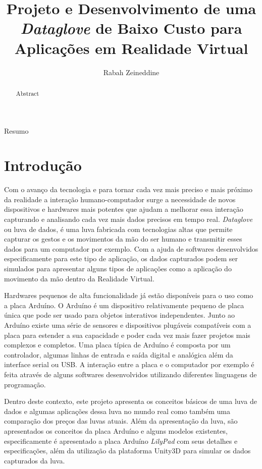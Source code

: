 \documentclass[12pt]{article}
\title{Projeto e Desenvolvimento de uma \textit{Dataglove} de Baixo Custo para Aplicações em Realidade Virtual}
\author{Rabah Zeineddine}
\begin{document}
 

\maketitle

\begin{abstract}
    Abstract
\end{abstract}
     
\begin{resumo} 
    Resumo
\end{resumo}


\section{Introdução}

Com o avanço da tecnologia e para tornar cada vez mais preciso e mais próximo da realidade a interação humano-computador surge a necessidade de novos dispositivos e hardwares mais potentes que ajudam a melhorar essa interação capturando e analisando cada vez mais dados precisos em tempo real. \textit{Dataglove} ou luva de dados, é uma luva fabricada com tecnologias altas que permite capturar os gestos e os movimentos da mão do ser humano e transmitir esses dados para um computador por exemplo. Com a ajuda de softwares desenvolvidos especificamente para este tipo de aplicação, os dados capturados podem ser simulados para apresentar alguns tipos de aplicações como a aplicação do movimento da mão dentro da Realidade Virtual.

Hardwares pequenos de alta funcionalidade já estão disponíveis para o uso como a placa Arduíno. O Arduíno é um dispositivo relativamente pequeno de placa única que pode ser usado para objetos interativos independentes. Junto ao Arduíno existe uma série de sensores e dispositivos plugáveis compatíveis com a placa para estender a sua capacidade e poder cada vez mais fazer projetos mais complexos e completos. Uma placa típica de Arduíno é composta por um controlador, algumas linhas de entrada e saída digital e analógica além da interface serial ou USB. A interação entre a placa e o computador por exemplo é feita através de alguns softwares desenvolvidos utilizando diferentes linguagens de programação.

Dentro deste contexto, este projeto apresenta os conceitos básicos de uma luva de dados e algumas aplicações dessa luva no mundo real como também uma comparação dos preços das luvas atuais. Além da apresentação da luva, são apresentados os conceitos da placa Arduíno e alguns modelos existentes, especificamente é apresentado a placa Arduíno \textit{LilyPad} com seus detalhes e especificações, além da utilização da plataforma Unity3D para simular os dados capturados da luva.
\end{document}
